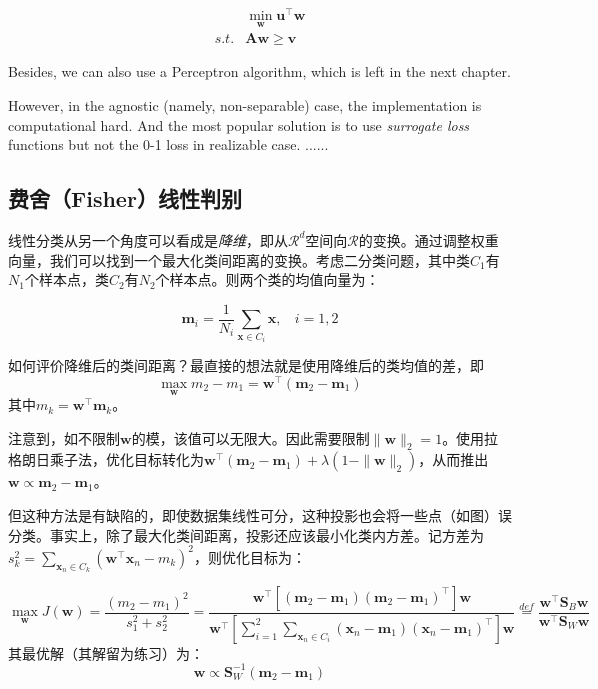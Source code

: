 \documentclass{article}
\begin{document}
	\begin{equation*}
	\begin{split}
	&\min_\mathbf{w} \mathbf{u}^\top \mathbf{w} \\
	s.t. & \mathbf{Aw} \geq \mathbf{v}
	\end{split}
	\end{equation*}
	
Besides, we can also use a Perceptron algorithm, which is left in the next chapter.
	
	However, in the agnostic (namely, non-separable) case, the implementation is computational hard. And the most popular solution is to use \textit{surrogate loss} functions but not the 0-1 loss in realizable case. ......
	
	\subsection{费舍（Fisher）线性判别}
	
	线性分类从另一个角度可以看成是\textit{降维}，即从$\mathcal{R}^d$空间向$\mathcal{R}$的变换。通过调整权重向量，我们可以找到一个最大化类间距离的变换。考虑二分类问题，其中类$C_1$有$N_1$个样本点，类$C_2$有$N_2$个样本点。则两个类的均值向量为：

	\begin{equation*}
	\mathbf{m}_i = \frac{1}{N_i} \sum_{\mathbf{x} \in C_i} \mathbf{x}, \ \ \ \ i=1,2
	\end{equation*}
	
	如何评价降维后的类间距离？最直接的想法就是使用降维后的类均值的差，即
	\begin{equation*}
	\max_\mathbf{w} m_2- m_1=\mathbf{w}^\top (\mathbf{m}_2-\mathbf{m}_1)
	\end{equation*}
其中$m_k=\mathbf{w}^\top \mathbf{m}_k$。

	注意到，如不限制$\mathbf{w}$的模，该值可以无限大。因此需要限制$\|\mathbf{w}\|_2=1$。使用拉格朗日乘子法，优化目标转化为$\mathbf{w}^\top (\mathbf{m}_2-\mathbf{m}_1) + \lambda (1-\|\mathbf{w}\|_2)$，从而推出$\mathbf{w}\propto \mathbf{m}_2-\mathbf{m}_1$。
	
	但这种方法是有缺陷的，即使数据集线性可分，这种投影也会将一些点（如图）误分类。事实上，除了最大化类间距离，投影还应该最小化类内方差。记方差为$s_k^2=\sum_{\mathbf{x}_n\in C_k} (\mathbf{w}^\top\mathbf{x}_n-m_k)^2$，则优化目标为：
	
	\begin{equation}
	\max_\mathbf{w} J(\mathbf{w}) = \frac{(m_2-m_1)^2}{s_1^2+s_2^2} 
	= \frac{\mathbf{w}^\top \left[ (\mathbf{m}_2-\mathbf{m}_1)(\mathbf{m}_2-\mathbf{m}_1)^\top \right] \mathbf{w}}{\mathbf{w}^\top \left[ \sum_{i=1}^2 \sum_{\mathbf{x}_n\in C_i}(\mathbf{x}_n-\mathbf{m}_1)(\mathbf{x}_n-\mathbf{m}_1)^\top\right] \mathbf{w}}
	\overset{def}{=} \frac{\mathbf{w}^\top \mathbf{S}_B \mathbf{w}}{\mathbf{w}^\top \mathbf{S}_W \mathbf{w}}
	\end{equation}
其最优解（其解留为练习）为：
	\begin{equation*}
	\mathbf{w}\propto \mathbf{S}_W^{-1} (\mathbf{m}_2-\mathbf{m}_1)
	\end{equation*}
	
\end{document}

